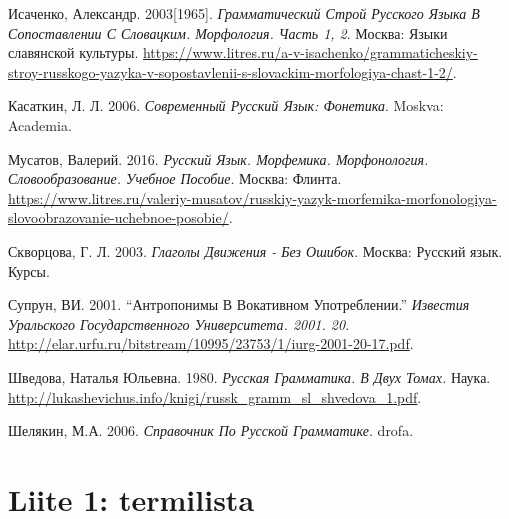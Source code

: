 \documentclass[]{scrreprt}
\begin{document}
Исаченко, Александр. 2003{[}1965{]}. \emph{Грамматический Строй Русского
Языка В Сопоставлении С Словацким. Морфология. Часть 1, 2}. Москва:
Языки славянской культуры.
\url{https://www.litres.ru/a-v-isachenko/grammaticheskiy-stroy-russkogo-yazyka-v-sopostavlenii-s-slovackim-morfologiya-chast-1-2/}. \\

Касаткин, Л. Л. 2006. \emph{Современный Русский Язык: Фонетика}. Moskva:
Academia. \\

Мусатов, Валерий. 2016. \emph{Русский Язык. Морфемика. Морфонология.
Словообразование. Учебное Пособие}. Москва: Флинта.
\url{https://www.litres.ru/valeriy-musatov/russkiy-yazyk-morfemika-morfonologiya-slovoobrazovanie-uchebnoe-posobie/}. \\

Скворцова, Г. Л. 2003. \emph{Глаголы Движения - Без Ошибок}. Москва:
Русский язык. Курсы. \\

Супрун, ВИ. 2001. ``Антропонимы В Вокативном Употреблении.''
\emph{Известия Уральского Государственного Университета. 2001. 20}.
\url{http://elar.urfu.ru/bitstream/10995/23753/1/iurg-2001-20-17.pdf}. \\

Шведова, Наталья Юльевна. 1980. \emph{Русская Грамматика. В Двух Томах.}
Наука.
\url{http://lukashevichus.info/knigi/russk_gramm_sl_shvedova_1.pdf}. \\

Шелякин, М.А. 2006. \emph{Справочник По Русской Грамматике}. drofa. \\



\chapter*{Liite 1: termilista}
\end{document}
